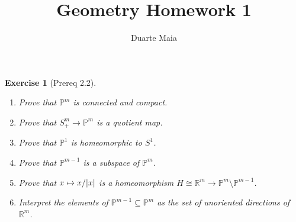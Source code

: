 \documentclass{article}
\title{Geometry Homework 1}
\author{Duarte Maia}
\theoremstyle{plain}
\newtheorem*{ex}{Exercise}
\theoremstyle{nonumberplain}
\newcommand{\R}{\mathbb{R}}
\newcommand{\PP}{\mathbb{P}}
\DeclarePairedDelimiter{\norm}{\lvert}{\rvert}
\begin{document}
\maketitle

\begin{ex}[Prereq 2.2]
\begin{enumerate}
\item Prove that $\PP^m$ is connected and compact.
\item Prove that $S^m_+ \to \PP^m$ is a quotient map.
\item Prove that $\PP^1$ is homeomorphic to $S^1$.
\item Prove that $\PP^{m-1}$ is a subspace of $\PP^m$.
\item Prove that $x \mapsto x/\norm x$ is a homeomorphism $H \cong \R^m \to \PP^m \setminus \PP^{m-1}$.
\item Interpret the elements of $\PP^{m-1} \subseteq \PP^m$ as the set of unoriented directions of $\R^m$.
\end{enumerate}
\end{ex}
\end{document}
